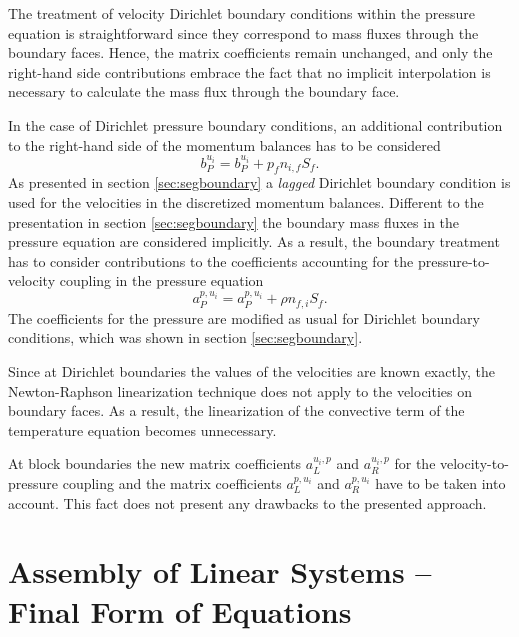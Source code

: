 The treatment of velocity Dirichlet boundary conditions within the pressure equation is straightforward since they correspond to mass fluxes through the boundary faces. Hence, the matrix coefficients remain unchanged, and only the right-hand side contributions embrace the fact that no implicit interpolation is necessary to calculate the mass flux through the boundary face.

In the case of Dirichlet pressure boundary conditions, an additional contribution to the right-hand side of the momentum balances has to be considered
\begin{displaymath}
  b_P^{u_i} = b_P^{u_i} + p_f n_{i,f} S_f.
\end{displaymath}
As presented in section \ref{sec:segboundary} a \emph{lagged} Dirichlet boundary condition is used for the velocities in the discretized momentum balances. Different to the presentation in section \ref{sec:segboundary} the boundary mass fluxes in the pressure equation are considered implicitly. As a result, the boundary treatment has to consider contributions to the coefficients accounting for the pressure-to-velocity coupling in the pressure equation
\begin{displaymath}
  a_P^{p,u_i} = a_P^{p,u_i} + \rho n_{f,i} S_f.
\end{displaymath}
The coefficients for the pressure are modified as usual for Dirichlet boundary conditions, which was shown in section \ref{sec:segboundary}.

Since at Dirichlet boundaries the values of the velocities are known exactly, the Newton-Raphson linearization technique does not apply to the velocities on boundary faces. As a result, the linearization of the convective term of the temperature equation becomes unnecessary.

At block boundaries the new matrix coefficients \(a_L^{u_i,p}\) and \(a_R^{u_i,p}\) for the velocity-to-pressure coupling and the matrix coefficients \(a_L^{p,u_i}\) and \(a_R^{p,u_i}\) have to be taken into account. This fact does not present any drawbacks to the presented approach.

\section{Assembly of Linear Systems -- Final Form of Equations}
\label{sec:cpldassembly}

